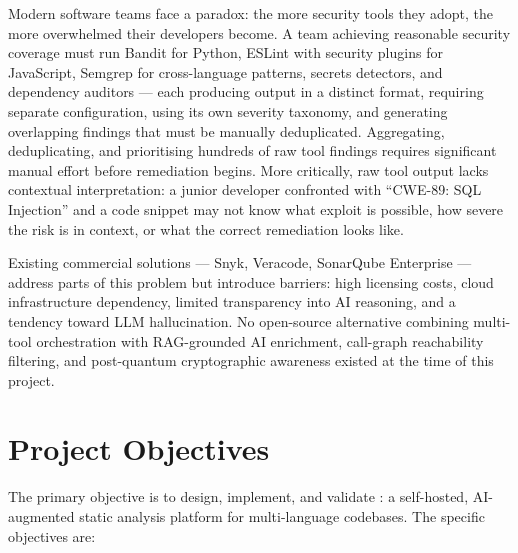 Modern software teams face a paradox: the more security tools they adopt, the more overwhelmed their developers become. A team achieving reasonable security coverage must run Bandit \cite{bandit_tool} for Python, ESLint with security plugins \cite{eslint_security} for JavaScript, Semgrep \cite{semgrep_tool} for cross-language patterns, secrets detectors, and dependency auditors \cite{cve_program} --- each producing output in a distinct format, requiring separate configuration, using its own severity taxonomy, and generating overlapping findings that must be manually deduplicated. Aggregating, deduplicating, and prioritising hundreds of raw tool findings requires significant manual effort before remediation begins. More critically, raw tool output lacks contextual interpretation: a junior developer confronted with ``CWE-89: SQL Injection'' and a code snippet may not know what exploit is possible, how severe the risk is in context, or what the correct remediation looks like.

Existing commercial solutions --- Snyk, Veracode, SonarQube Enterprise --- address parts of this problem but introduce barriers: high licensing costs, cloud infrastructure dependency, limited transparency into AI reasoning, and a tendency toward LLM hallucination. No open-source alternative combining multi-tool orchestration with RAG-grounded AI enrichment, call-graph reachability filtering, and post-quantum cryptographic awareness existed at the time of this project.

\section{Project Objectives}
\label{sec:objectives}

The primary objective is to design, implement, and validate \ACRQA{}: a self-hosted, AI-augmented static analysis platform for multi-language codebases. The specific objectives are:


